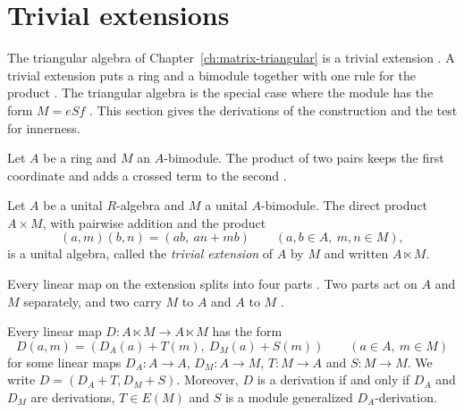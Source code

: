 \section{Trivial extensions}\label{sec:path-incidence:trivial-extension}

The triangular algebra of Chapter~\ref{ch:matrix-triangular} is a trivial extension
\cite[p.~5]{BennisFahid2017}. A trivial extension puts a ring and a bimodule together
with one rule for the product \cite[p.~4]{BennisFahid2017}. The triangular algebra
is the special case where the module has the form $M=eSf$
\cite[p.~5]{BennisFahid2017}. This section gives the derivations of the
construction and the test for innerness.

Let $A$ be a ring and $M$ an $A$-bimodule. The product of two pairs keeps the first
coordinate and adds a crossed term to the second \cite[p.~4]{BennisFahid2017}.

\begin{definition}\label{def:trivial:extension}
Let $A$ be a unital $R$-algebra and $M$ a unital $A$-bimodule. The direct product
$A\times M$, with pairwise addition and the product
\begin{equation*}
(a,m)(b,n)=(ab,\ an+mb)\qquad(a,b\in A,\ m,n\in M),
\end{equation*}
is a unital algebra, called the \emph{trivial extension} of $A$ by $M$ and written
$A\ltimes M$.
\end{definition}

Every linear map on the extension splits into four parts
\cite[p.~8]{BennisFahid2017}. Two parts act on $A$ and $M$ separately, and two carry
$M$ to $A$ and $A$ to $M$ \cite[p.~8]{BennisFahid2017}.

\begin{lemma}\label{lem:trivial:form}
Every linear map $D\colon A\ltimes M\to A\ltimes M$ has the form
\begin{equation*}
D(a,m)=(D_{A}(a)+T(m),\ D_{M}(a)+S(m))\qquad(a\in A,\ m\in M)
\end{equation*}
for some linear maps $D_{A}\colon A\to A$, $D_{M}\colon A\to M$, $T\colon M\to A$ and
$S\colon M\to M$. We write $D=(D_{A}+T,D_{M}+S)$.
Moreover, $D$ is a derivation if and only if $D_{A}$ and $D_{M}$ are derivations,
$T\in E(M)$ and $S$ is a module generalized $D_{A}$-derivation.
\end{lemma}

